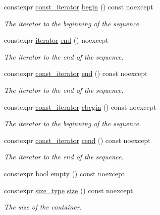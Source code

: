 \begin{DoxyCompactItemize}
\item 
constexpr \hyperlink{group__Types_ga2c50f8cbc96829f139f8138f1bac40bf}{const\-\_\-iterator} \hyperlink{group__Iterators_ga0c88522dde8cb2ff1c2c523abbb01ff0}{begin} () const noexcept
\begin{DoxyCompactList}\small\item\em The iterator to the beginning of the sequence. \end{DoxyCompactList}\item 
constexpr \hyperlink{group__Types_ga7b1db0deafc45673f50da5aacb8c372c}{iterator} \hyperlink{group__Iterators_ga1c4d3a9b4b7ba4890e21bad16c8b4a58}{end} () noexcept
\begin{DoxyCompactList}\small\item\em The iterator to the end of the sequence. \end{DoxyCompactList}\item 
constexpr \hyperlink{group__Types_ga2c50f8cbc96829f139f8138f1bac40bf}{const\-\_\-iterator} \hyperlink{group__Iterators_ga75ec94abc79b646edb6d978b98db69da}{end} () const noexcept
\begin{DoxyCompactList}\small\item\em The iterator to the end of the sequence. \end{DoxyCompactList}\item 
constexpr \hyperlink{group__Types_ga2c50f8cbc96829f139f8138f1bac40bf}{const\-\_\-iterator} \hyperlink{group__Iterators_gab6c412cc8aa5cbd90f50263e3aa76915}{cbegin} () const noexcept
\begin{DoxyCompactList}\small\item\em The iterator to the beginning of the sequence. \end{DoxyCompactList}\item 
constexpr \hyperlink{group__Types_ga2c50f8cbc96829f139f8138f1bac40bf}{const\-\_\-iterator} \hyperlink{group__Iterators_ga9781beb1f058654a6b1a2580e7a5f9a4}{cend} () const noexcept
\begin{DoxyCompactList}\small\item\em The iterator to the end of the sequence. \end{DoxyCompactList}\item 
constexpr bool \hyperlink{group__Capacity_ga4200ae5ef6eba0507e3fb3cbf58d6ead}{empty} () const noexcept
\item 
constexpr \hyperlink{group__Types_ga037c76c91958f47f53bfebad4d67f8bb}{size\-\_\-type} \hyperlink{group__Capacity_gaed56012900efe8db9fdc2c6023cf0c60}{size} () const noexcept
\begin{DoxyCompactList}\small\item\em The size of the container. \end{DoxyCompactList}\item 

\end{DoxyCompactItemize}
